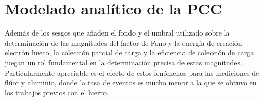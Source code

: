 \chapter{Modelado analítico de la PCC \label{chap:ModeloPCC}}
\noindent Además de los sesgos que añaden el fondo y el umbral utilizado sobre la determinación de las magnitudes del factor de Fano y la energía de creación electrón hueco, la colección parcial de carga y la eficiencia de colección de carga juegan un rol fundamental en la determinación precisa de estas magnitudes. Particularmente apreciable es el efecto de estos fenómenos para las mediciones de flúor y aluminio, donde la tasa de eventos es mucho menor a la que se obtuvo en los trabajos previos\cite{TesisAndi,TesisKevin,Rodrigues} con el hierro.
